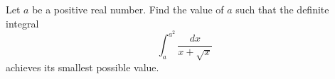 Let $a$ be a positive real number.  Find the value of $a$ such that the definite integral \[\int_a^{a^2} \dfrac{dx}{x+\sqrt{x}}\] achieves its smallest possible value.